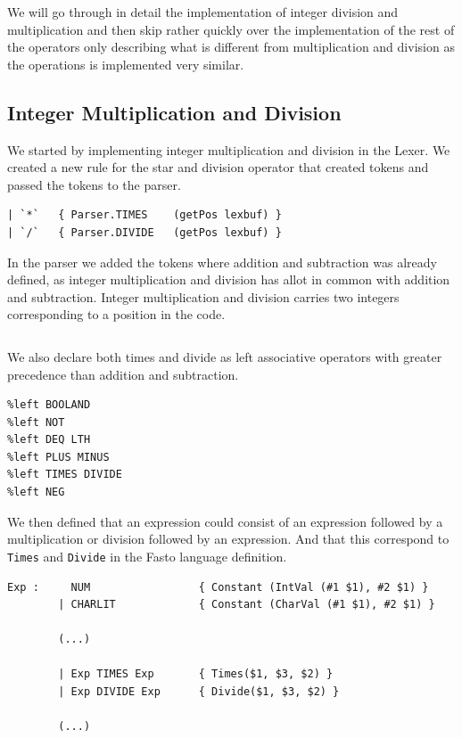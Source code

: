 \documentclass[11pt]{article}
\begin{document}
    We will go through in detail the implementation of integer division and
    multiplication and then skip rather quickly over the implementation of the
    rest of the operators only describing what is different from multiplication
    and division as the operations is implemented very similar.

    \subsection{Integer Multiplication and Division}
    We started by implementing integer multiplication and division in the Lexer.
    We created a new rule for the star and division operator that created tokens
    and passed the tokens to the parser.

    \begin{lstlisting}[basicstyle=\small]
| `*`   { Parser.TIMES    (getPos lexbuf) }
| `/`   { Parser.DIVIDE   (getPos lexbuf) }
    \end{lstlisting}

    In the parser we added the tokens where addition and subtraction was already
    defined, as integer multiplication and division has allot in common with
    addition and subtraction.  Integer multiplication and division carries two
    integers corresponding to a position in the code.

    \begin{lstlisting}[basicstyle=\small]
%token <(int*int)> PLUS MINUS TIMES DIVIDE DEQ EQ LTH BOOLAND BOOLOR NOT NEG
    \end{lstlisting}

    We also declare both times and divide as left associative operators with
    greater precedence than addition and subtraction.

    \begin{lstlisting}[basicstyle=\small]
%left BOOLOR
%left BOOLAND
%left NOT
%left DEQ LTH
%left PLUS MINUS
%left TIMES DIVIDE
%left NEG
    \end{lstlisting}

    We then defined that an expression could consist of an expression followed
    by a multiplication or division followed by an expression.  And that this
    correspond to \texttt{Times} and \texttt{Divide} in the Fasto language
    definition.

    \begin{lstlisting}[basicstyle=\small]
Exp :     NUM                 { Constant (IntVal (#1 $1), #2 $1) }
        | CHARLIT             { Constant (CharVal (#1 $1), #2 $1) }

        (...)

        | Exp TIMES Exp       { Times($1, $3, $2) }
        | Exp DIVIDE Exp      { Divide($1, $3, $2) }

        (...)
    \end{lstlisting}
\end{document}
